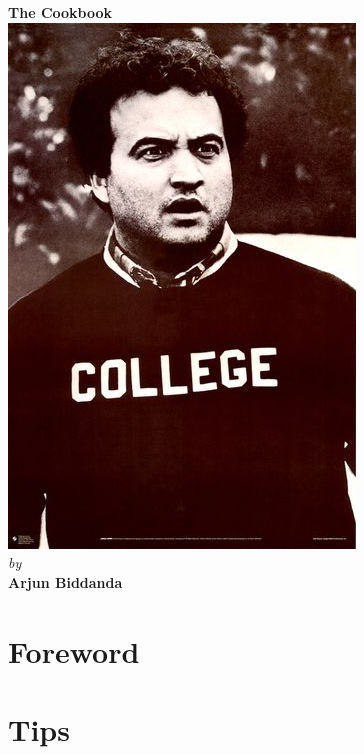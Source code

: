 \documentclass[oneside]{recipe}
\begin{document}
\begin{titlepage}
\begin{center}
	\textbf{\Huge The Cookbook }\\
	\vspace*{\fill}
	\includegraphics[scale=2]{img/college}\\
	\vspace*{\fill}
	\textit{\large by}\\
	\vspace*{4pt}
	\textbf{\large Arjun Biddanda}
	\vspace*{\fill}
	\end{center}
\end{titlepage}

\tableofcontents
\chapter{Foreword}


\chapter{Tips}

\end{document}
